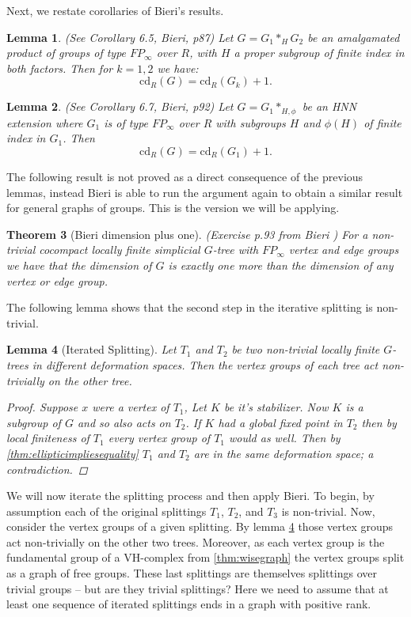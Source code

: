 \documentclass[12pt,parskip=full]{report}
\theoremstyle{plain}
\newtheorem{thm}{Theorem}[section]
\newtheorem{lem}[thm]{Lemma}
\theoremstyle{definition}
\begin{document}
Next, we restate corollaries of Bieri's results.
\begin{lem}
(See Corollary 6.5, Bieri, p87)
Let \(G=G_1\ast_H G_2\) be an amalgamated product of groups of type \(FP_\infty\) over \(R\), with \(H\) a proper subgroup of finite index in both factors. Then for \(k=1,2\) we have: \[\text{cd}_R(G)=\text{cd}_R(G_k)+1.\]
\end{lem}

\begin{lem}
(See Corollary 6.7, Bieri, p92)
Let \(G=G_1\ast_{H,\phi}\) be an HNN extension where \(G_1\) is of type \(FP_\infty\) over \(R\) with subgroups \(H\) and \(\phi(H)\) of finite index in \(G_1\). Then \[\text{cd}_R(G) = \text{cd}_R(G_1)+1.\]
\end{lem}

The following result is not proved as a direct consequence of the previous lemmas, instead Bieri is able to run the argument again to obtain a similar result for general graphs of groups. This is the version we will be applying.
\begin{thm}
    [Bieri dimension plus one]
    \label{pro:bireridimension}
    (Exercise p.93 from Bieri \cite{bieribook})
    For a non-trivial cocompact locally finite simplicial \(G\)-tree with \(FP_\infty\) vertex and edge groups we have that the dimension of \(G\) is exactly one more than the dimension of any vertex or edge group.
\end{thm}

The following lemma shows that the second step in the iterative splitting is non-trivial.

\begin{lem}
    [Iterated Splitting]
    \label{lem:iteratedsplitting} 
    Let \(T_1\) and \(T_2\) be two non-trivial locally finite \(G\)-trees in different deformation spaces. Then the vertex groups of each tree act non-trivially on the other tree.
    \begin{proof}
        Suppose \(x\) were a vertex of \(T_1\), Let \(K\) be it's stabilizer. Now \(K\) is a subgroup of \(G\) and so also acts on \(T_2\). If \(K\) had a global fixed point in \(T_2\)  then by local finiteness of \(T_1\) every vertex group of \(T_1\) would as well. Then by \ref{thm:ellipticimpliesequality} \(T_1\) and \(T_2\) are in the same deformation space; a contradiction.
    \end{proof}
\end{lem}

We will now iterate the splitting process and then apply Bieri. To begin, by assumption each of the original splittings \(T_1\), \(T_2\), and \(T_3\) is non-trivial. Now, consider the vertex groups of a given splitting. By lemma \ref{lem:iteratedsplitting} those vertex groups act non-trivially on the other two trees. Moreover, as each vertex group is the fundamental group of a VH-complex from \ref{thm:wisegraph} the vertex groups split as a graph of free groups. These last splittings are themselves splittings over trivial groups -- but are they trivial splittings? Here we need to assume that at least one sequence of iterated splittings ends in a graph with positive rank.
        
\end{document}
